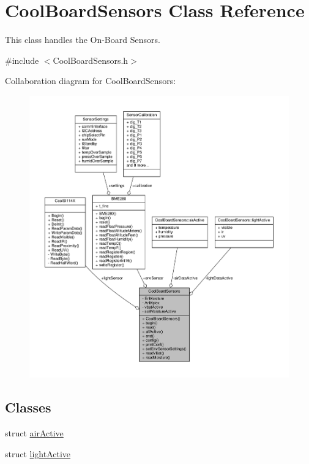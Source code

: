 \hypertarget{class_cool_board_sensors}{}\section{Cool\+Board\+Sensors Class Reference}
\label{class_cool_board_sensors}


This class handles the On-\/\+Board Sensors.  




{\ttfamily \#include $<$Cool\+Board\+Sensors.\+h$>$}



Collaboration diagram for Cool\+Board\+Sensors\+:\nopagebreak
\begin{figure}[H]
\begin{center}
\leavevmode
\includegraphics[width=350pt]{df/db9/class_cool_board_sensors__coll__graph}
\end{center}
\end{figure}
\subsection*{Classes}
\begin{DoxyCompactItemize}
\item 
struct \hyperlink{struct_cool_board_sensors_1_1air_active}{air\+Active}
\item 
struct \hyperlink{struct_cool_board_sensors_1_1light_active}{light\+Active}
\end{DoxyCompactItemize}
